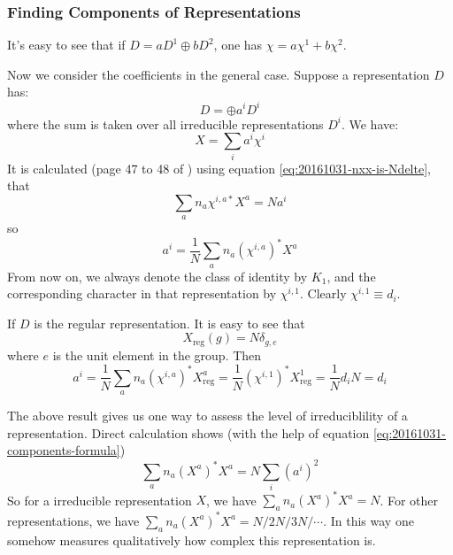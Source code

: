    \subsubsection{Finding Components of Representations}
    \label{sec:Finding-Components-of-Representations}
    \begin{remark}
        It's easy to see that if $D=aD^1\oplus bD^2$, one has $\chi =
        a\chi^1 + b\chi^2$.
    \end{remark}
    Now we consider the coefficients in the general case. Suppose a
    representation $D$ has:
    \begin{equation}
        D = \oplus a^i D^i
    \end{equation}
    where the sum is taken over all irreducible representations
    $D^i$. We have:
    \begin{equation}
        X = \sum_{i} a^i \chi^i
    \end{equation}
    It is calculated (page 47 to 48 of \cite{Ludeling}) using equation
    \ref{eq:20161031-nxx-is-Ndelte},
    that
    \begin{equation}
        \sum_a n_a \chi^{i,a*}X^a = N a^i
    \end{equation}
    so
    \begin{equation}
        a^i = \frac{1}{N} \sum_a n_a(\chi^{i,a})^* X^a
        \label{eq:20161031-components-formula}
    \end{equation}
    From now on, we always denote the class of identity by $K_1$, and
    the corresponding character in that representation by
    $\chi^{i,1}$. Clearly $\chi^{i,1}\equiv d_i$.
    \begin{ex}
        If $D$ is the regular representation. It is easy to see that
        \begin{equation}
            X_\text{reg}(g) = N \delta_{g,e}
        \end{equation}
        where $e$ is the unit element in the group.
        Then
        \begin{equation}
            a^i = \frac{1}{N}\sum_a n_a (\chi^{i,a})^* X^a_\text{reg}
            = \frac{1}{N} (\chi^{i,1})^* X^1_\text{reg} = 
            \frac{1}{N} d_i N = d_i
        \end{equation}
    \end{ex}
    \begin{remark}
        The above result gives us one way to assess the level of
        irreduciblility of a representation. Direct calculation shows
        (with the help of equation
        \ref{eq:20161031-components-formula})
        \begin{equation}
            \sum_a n_a (X^a)^* X^a = N \sum_i (a^i)^2
        \end{equation}
        So for a irreducible representation $X$, we have $\sum_a n_a
        (X^a)^* X^a= N$. For other representations, we have $\sum_a
        n_a (X^a)^* X^a= N/2N/3N/\cdots$. In this way one somehow
        measures qualitatively how complex this representation is.
    \end{remark}
